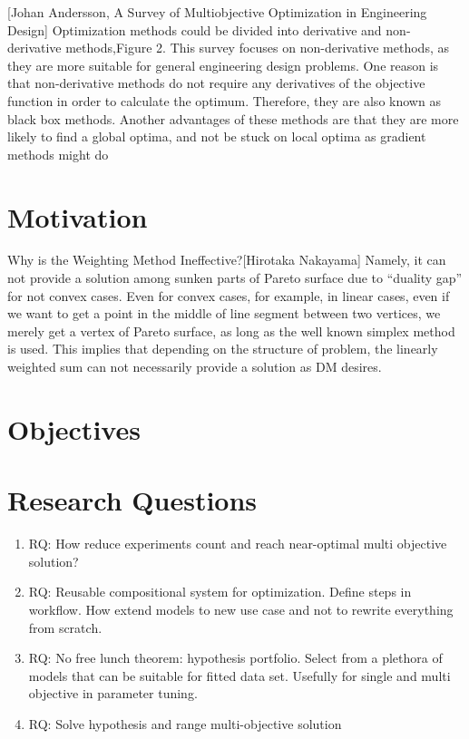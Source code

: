 [Johan Andersson, A Survey of Multiobjective Optimization in Engineering Design] 
Optimization methods could be divided into derivative and non-derivative methods,Figure 2. This survey focuses on non-derivative methods, as they are more suitable for
general engineering design problems. One reason is that non-derivative methods do not
require any derivatives of the objective function in order to calculate the optimum.
Therefore, they are also known as black box methods. Another advantages of these
methods are that they are more likely to find a global optima, and not be stuck on local
optima as gradient methods might do

\section{Motivation}
Why is the Weighting Method Ineffective?[Hirotaka Nakayama]
Namely, it can not provide a solution among sunken parts of Pareto surface due to “duality gap” for not convex cases. 
Even for convex cases, for example, in linear cases, even if we want to get a point in the middle of line segment between two vertices, we merely get a vertex of Pareto surface, as
long as the well known simplex method is used. This implies that depending on the structure of problem, the linearly weighted sum can not necessarily provide a solution as DM desires.

\section{Objectives}


\section{Research Questions}
\begin{enumerate}
    \item RQ: How reduce experiments count and reach near-optimal multi objective solution?
    \item RQ: Reusable compositional system for optimization. Define steps in workflow. How extend models to new use case and not to rewrite everything from scratch.
    \item RQ: No free lunch theorem: hypothesis portfolio. Select from a plethora of models that can be suitable for fitted data set. Usefully for single and multi objective in parameter tuning.
    \item RQ: Solve hypothesis and range multi-objective solution
\end{enumerate}


